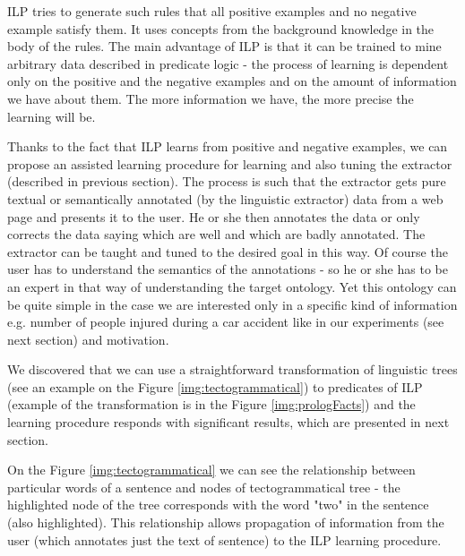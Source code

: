 \documentclass{sig-alternate}
\begin{document}
ILP tries to generate such rules that all positive examples and no negative example satisfy them. It uses concepts from the background knowledge in the body of the rules.
The main advantage of ILP is that it can be trained to mine arbitrary data described in predicate logic - the process of learning is dependent only on the positive and the negative examples and on the amount of information we have about them. The more information we have, the more precise the learning will be. \par

Thanks to the fact that ILP learns from positive and negative examples, we can propose an assisted learning procedure for learning and also tuning the extractor (described in previous section). The process is such that the extractor gets pure textual or semantically annotated (by the linguistic extractor) data from a web page and presents it to the user. He or she then annotates the data or only corrects the data saying which are well and which are badly annotated. The extractor can be taught and tuned to the desired goal in this way. Of course the user has to understand the semantics of the annotations - so he or she has to be an expert in that way of understanding the target ontology. Yet this ontology can be quite simple in the case we are interested only in a specific kind of information e.g. number of people injured during a car accident like in our experiments (see next section) and motivation. 

We discovered that we can use a straightforward transformation of linguistic trees (see an example on the Figure \ref{img:tectogrammatical}) to predicates of ILP (example of the transformation is in the Figure \ref{img:prologFacts}) and the learning procedure responds with significant results, which are presented in next section.

On the Figure \ref{img:tectogrammatical} we can see the relationship between particular words of a sentence and nodes of tectogrammatical tree - the highlighted node of the tree corresponds with the word "two" in the sentence (also highlighted). This relationship allows propagation of information from the user (which annotates just the text of sentence) to the ILP learning procedure.
\end{document}
